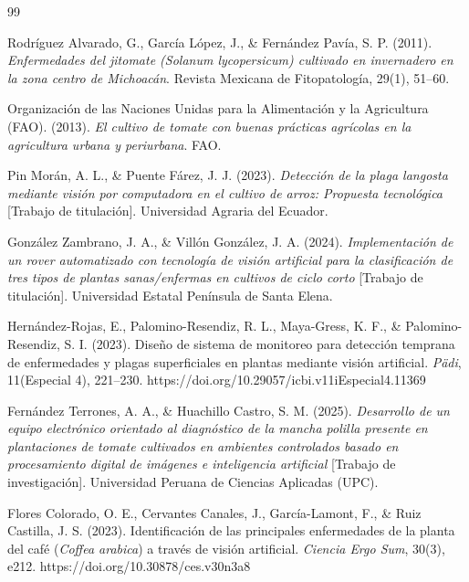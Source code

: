 \clearpage
{}
\renewcommand{\bibname}{Referencias}

\begin{thebibliography}{99}

    Rodríguez Alvarado, G., García López, J., \& Fernández Pavía, S. P. (2011).
    \textit{Enfermedades del jitomate (\textit{Solanum lycopersicum}) cultivado en invernadero en la zona centro de Michoacán}.
    Revista Mexicana de Fitopatología, 29(1), 51--60.

    Organización de las Naciones Unidas para la Alimentación y la Agricultura (FAO). (2013).
    \textit{El cultivo de tomate con buenas prácticas agrícolas en la agricultura urbana y periurbana}.
    FAO.

    Pin Morán, A. L., \& Puente Fárez, J. J. (2023).
    \textit{Detección de la plaga langosta mediante visión por computadora en el cultivo de arroz: Propuesta tecnológica}
    [Trabajo de titulación].
    Universidad Agraria del Ecuador.

    González Zambrano, J. A., \& Villón González, J. A. (2024).
    \textit{Implementación de un rover automatizado con tecnología de visión artificial para la clasificación de tres tipos de plantas sanas/enfermas en cultivos de ciclo corto}
    [Trabajo de titulación].
    Universidad Estatal Península de Santa Elena.

    Hernández-Rojas, E., Palomino-Resendiz, R. L., Maya-Gress, K. F., \& Palomino-Resendiz, S. I. (2023).
    Diseño de sistema de monitoreo para detección temprana de enfermedades y plagas superficiales en plantas mediante visión artificial.
    \textit{Pädi}, 11(Especial 4), 221--230.
    https://doi.org/10.29057/icbi.v11iEspecial4.11369

    Fernández Terrones, A. A., \& Huachillo Castro, S. M. (2025).
    \textit{Desarrollo de un equipo electrónico orientado al diagnóstico de la mancha polilla presente en plantaciones de tomate cultivados en ambientes controlados basado en procesamiento digital de imágenes e inteligencia artificial}
    [Trabajo de investigación].
    Universidad Peruana de Ciencias Aplicadas (UPC).

    Flores Colorado, O. E., Cervantes Canales, J., García-Lamont, F., \& Ruiz Castilla, J. S. (2023).
    Identificación de las principales enfermedades de la planta del café (\textit{Coffea arabica}) a través de visión artificial.
    \textit{Ciencia Ergo Sum}, 30(3), e212.
    https://doi.org/10.30878/ces.v30n3a8


\end{thebibliography}
